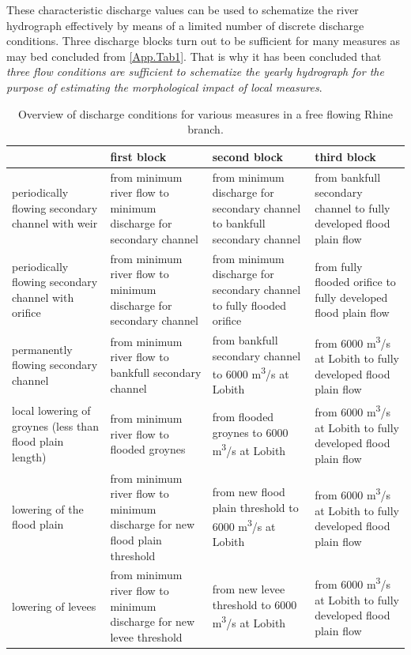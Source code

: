 These characteristic discharge values can be used to schematize the river hydrograph effectively by means of a limited number of discrete discharge conditions.
Three discharge blocks turn out to be sufficient for many measures as may bed concluded from \autoref{App.Tab1}.
That is why it has been concluded that \emph{three flow conditions are sufficient to schematize the yearly hydrograph for the purpose of estimating the morphological impact of local measures}.

\begin{table}
\small
\begin{tabular}{p{}|p{}|p{}|p{}}
 & first block & second block & third block \\ \hline
periodically flowing secondary channel with weir & from minimum river flow to minimum discharge for secondary channel & from minimum discharge for secondary channel to bankfull secondary channel & from bankfull secondary channel to fully developed flood plain flow \\ \hline
periodically flowing secondary channel with orifice & from minimum river flow to minimum discharge for secondary channel & from minimum discharge for secondary channel to fully flooded orifice & from fully flooded orifice to fully developed flood plain flow \\ \hline
permanently flowing secondary channel & from minimum river flow to bankfull secondary channel & from bankfull secondary channel to 6000 m\textsuperscript{3}/s at Lobith & from 6000 m\textsuperscript{3}/s at Lobith to fully developed flood plain flow \\ \hline
local lowering of groynes (less than flood plain length) & from minimum river flow to flooded groynes & from flooded groynes to 6000 m\textsuperscript{3}/s at Lobith & from 6000 m\textsuperscript{3}/s at Lobith to fully developed flood plain flow \\ \hline
lowering of the flood plain & from minimum river flow to minimum discharge for new flood plain threshold & from new flood plain threshold to 6000 m\textsuperscript{3}/s at Lobith & from 6000 m\textsuperscript{3}/s at Lobith to fully developed flood plain flow \\ \hline
lowering of levees & from minimum river flow to minimum discharge for new levee threshold & from new levee threshold to 6000 m\textsuperscript{3}/s at Lobith & from 6000 m\textsuperscript{3}/s at Lobith to fully developed flood plain flow \\
\end{tabular}

\caption{Overview of discharge conditions for various measures in a free flowing Rhine branch.}
\label{App.Tab1}
\end{table}

